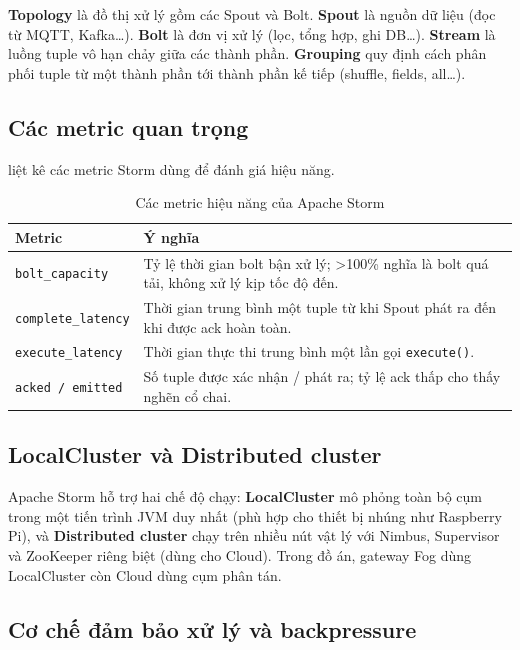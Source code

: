 \documentclass[13pt,a4paper]{report}
\newcommand{\code}[1]{\texttt{\small #1}}
\begin{document}
\textbf{Topology} là đồ thị xử lý gồm các Spout và Bolt. \textbf{Spout} là nguồn
dữ liệu (đọc từ MQTT, Kafka\dots). \textbf{Bolt} là đơn vị xử lý (lọc, tổng hợp,
ghi DB\dots). \textbf{Stream} là luồng tuple vô hạn chảy giữa các thành phần.
\textbf{Grouping} quy định cách phân phối tuple từ một thành phần tới thành phần
kế tiếp (shuffle, fields, all\dots).

\subsection{Các metric quan trọng}

 liệt kê các metric Storm dùng để đánh giá hiệu năng.

\begin{table}[H]
\centering
\caption{Các metric hiệu năng của Apache Storm}
\label{tab:storm-metric}
\begin{tabular}{p{} p{}}
\toprule
\textbf{Metric} & \textbf{Ý nghĩa} \\
\midrule
\code{bolt\_capacity}   & Tỷ lệ thời gian bolt bận xử lý; \textgreater 100\% nghĩa là bolt quá tải, không xử lý kịp tốc độ đến. \\
\code{complete\_latency}& Thời gian trung bình một tuple từ khi Spout phát ra đến khi được ack hoàn toàn. \\
\code{execute\_latency} & Thời gian thực thi trung bình một lần gọi \code{execute()}. \\
\code{acked / emitted}  & Số tuple được xác nhận / phát ra; tỷ lệ ack thấp cho thấy nghẽn cổ chai. \\
\bottomrule
\end{tabular}
\end{table}

\subsection{LocalCluster và Distributed cluster}

Apache Storm hỗ trợ hai chế độ chạy: \textbf{LocalCluster} mô phỏng toàn bộ cụm
trong một tiến trình JVM duy nhất (phù hợp cho thiết bị nhúng như Raspberry Pi),
và \textbf{Distributed cluster} chạy trên nhiều nút vật lý với Nimbus,
Supervisor và ZooKeeper riêng biệt (dùng cho Cloud). Trong đồ án, gateway Fog
dùng LocalCluster còn Cloud dùng cụm phân tán.

\subsection{Cơ chế đảm bảo xử lý và backpressure}
\label{sec:acking}
\end{document}
